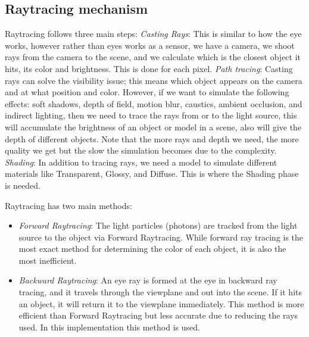 \documentclass[11pt,a4paper]{article}
\begin{document}
	\subsection{Raytracing mechanism}
	Raytracing follows three main steps: 
	\textit{Casting Rays}: This is similar to how the eye works, however rather than eyes works as a sensor, we have a camera, we shoot rays from the camera to the scene, and we calculate which is the closest object it hits, its color and brightness. This is done for each pixel.
	\textit{Path tracing}: Casting rays can solve the visibility issue; this means which object appears on the camera and at what position and color. However, if we want to simulate the following effects:  soft shadows, depth of field, motion blur, caustics, ambient occlusion, and indirect lighting, then we need to trace the rays from or to the light source, this will accumulate the brightness of an object or model in a scene, also will give the depth of different objects. Note that the more rays and depth we need, the more quality we get but the slow the simulation becomes due to the complexity.
	\textit{Shading}: In addition to tracing rays, we need a model to simulate different materials like Transparent, Glossy, and Diffuse. This is where the Shading phase is needed.
	
	\vspace*{5px}
	Raytracing has two main methods: 
	\begin{itemize}
		\item 		\textit{Forward Raytracing}: The light particles (photons) are tracked from the light source to the object via Forward Raytracing. While forward ray tracing is the most exact method for determining the color of each object, it is also the most inefficient.
		\item 		\textit{Backward Raytracing}: 
		An eye ray is formed at the eye in backward ray tracing, and it travels through the viewplane and out into the scene. If it hits an object, it will return it to the viewplane immediately. This method is more efficient than Forward Raytracing but less accurate due to reducing the rays used. In this implementation this method is used.
	\end{itemize}
	
\end{document}
